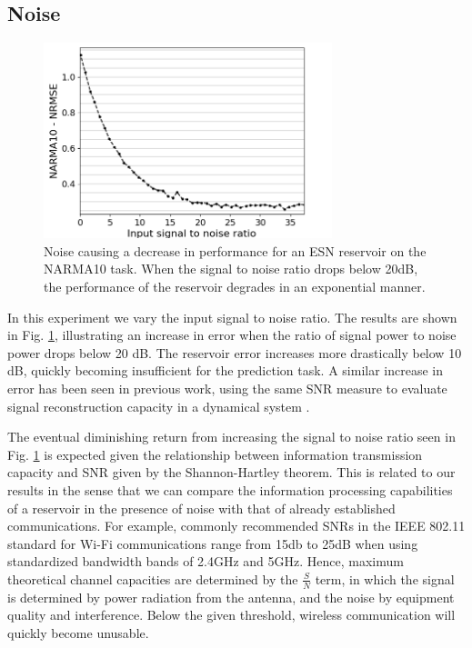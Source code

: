 \subsection{Noise}

\begin{figure}[t!]
  \centering
  \includegraphics[width=3.3in]{img/input_noise_snr.png}
  \caption{
    Noise causing a decrease in performance for an ESN reservoir on the NARMA10
task. When the signal to noise ratio drops below 20dB, the performance of the
reservoir degrades in an exponential manner.
  }
  \label{input_noise_snr}
\end{figure}

In this experiment we vary the input signal to noise ratio. The results are
shown in Fig. \ref{input_noise_snr}, illustrating an increase in error when the
ratio of signal power to noise power drops below 20 dB. The reservoir error
increases more drastically below 10 dB, quickly becoming insufficient for the
prediction task. A similar increase in error has been seen in previous work,
using the same SNR measure to evaluate signal reconstruction capacity in a
dynamical system \cite{dambre_information_2012}.

The eventual diminishing return from increasing the signal to noise ratio seen
in Fig. \ref{input_noise_snr} is expected given the relationship between
information transmission capacity and SNR given by the Shannon-Hartley
theorem. This is related to our results in the sense that we can compare the
information processing capabilities of a reservoir in the presence of noise with
that of already established communications. For example, commonly recommended
SNRs in the IEEE 802.11 standard for Wi-Fi communications range from 15db to
25dB when using standardized bandwidth bands of 2.4GHz and 5GHz. Hence, maximum
theoretical channel capacities are determined by the $\frac{S}{N}$ term, in
which the signal is determined by power radiation from the antenna, and the
noise by equipment quality and interference. Below the given threshold, wireless
communication will quickly become unusable.

